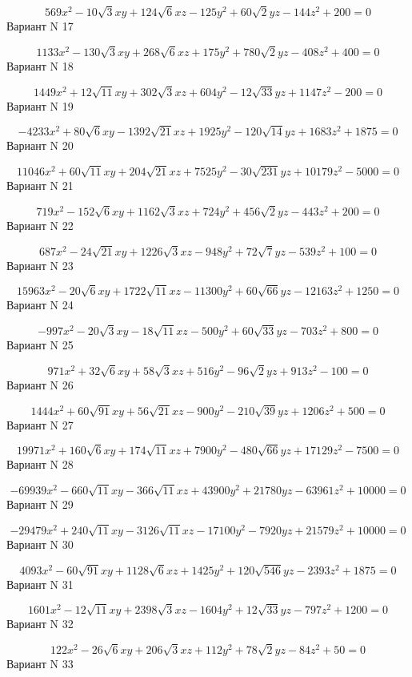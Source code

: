 \documentclass[11pt]{report}
\begin{document}
$$569 x^{2} - 10 \sqrt{3} x y + 124 \sqrt{6} x z - 125 y^{2} + 60 \sqrt{2} y z - 144 z^{2} + 200 = 0$$Вариант N 17

$$1133 x^{2} - 130 \sqrt{3} x y + 268 \sqrt{6} x z + 175 y^{2} + 780 \sqrt{2} y z - 408 z^{2} + 400 = 0$$Вариант N 18

$$1449 x^{2} + 12 \sqrt{11} x y + 302 \sqrt{3} x z + 604 y^{2} - 12 \sqrt{33} y z + 1147 z^{2} - 200 = 0$$Вариант N 19

$$- 4233 x^{2} + 80 \sqrt{6} x y - 1392 \sqrt{21} x z + 1925 y^{2} - 120 \sqrt{14} y z + 1683 z^{2} + 1875 = 0$$Вариант N 20

$$11046 x^{2} + 60 \sqrt{11} x y + 204 \sqrt{21} x z + 7525 y^{2} - 30 \sqrt{231} y z + 10179 z^{2} - 5000 = 0$$Вариант N 21

$$719 x^{2} - 152 \sqrt{6} x y + 1162 \sqrt{3} x z + 724 y^{2} + 456 \sqrt{2} y z - 443 z^{2} + 200 = 0$$Вариант N 22

$$687 x^{2} - 24 \sqrt{21} x y + 1226 \sqrt{3} x z - 948 y^{2} + 72 \sqrt{7} y z - 539 z^{2} + 100 = 0$$Вариант N 23

$$15963 x^{2} - 20 \sqrt{6} x y + 1722 \sqrt{11} x z - 11300 y^{2} + 60 \sqrt{66} y z - 12163 z^{2} + 1250 = 0$$Вариант N 24

$$- 997 x^{2} - 20 \sqrt{3} x y - 18 \sqrt{11} x z - 500 y^{2} + 60 \sqrt{33} y z - 703 z^{2} + 800 = 0$$Вариант N 25

$$971 x^{2} + 32 \sqrt{6} x y + 58 \sqrt{3} x z + 516 y^{2} - 96 \sqrt{2} y z + 913 z^{2} - 100 = 0$$Вариант N 26

$$1444 x^{2} + 60 \sqrt{91} x y + 56 \sqrt{21} x z - 900 y^{2} - 210 \sqrt{39} y z + 1206 z^{2} + 500 = 0$$Вариант N 27

$$19971 x^{2} + 160 \sqrt{6} x y + 174 \sqrt{11} x z + 7900 y^{2} - 480 \sqrt{66} y z + 17129 z^{2} - 7500 = 0$$Вариант N 28

$$- 69939 x^{2} - 660 \sqrt{11} x y - 366 \sqrt{11} x z + 43900 y^{2} + 21780 y z - 63961 z^{2} + 10000 = 0$$Вариант N 29

$$- 29479 x^{2} + 240 \sqrt{11} x y - 3126 \sqrt{11} x z - 17100 y^{2} - 7920 y z + 21579 z^{2} + 10000 = 0$$Вариант N 30

$$4093 x^{2} - 60 \sqrt{91} x y + 1128 \sqrt{6} x z + 1425 y^{2} + 120 \sqrt{546} y z - 2393 z^{2} + 1875 = 0$$Вариант N 31

$$1601 x^{2} - 12 \sqrt{11} x y + 2398 \sqrt{3} x z - 1604 y^{2} + 12 \sqrt{33} y z - 797 z^{2} + 1200 = 0$$Вариант N 32

$$122 x^{2} - 26 \sqrt{6} x y + 206 \sqrt{3} x z + 112 y^{2} + 78 \sqrt{2} y z - 84 z^{2} + 50 = 0$$Вариант N 33
\end{document}
